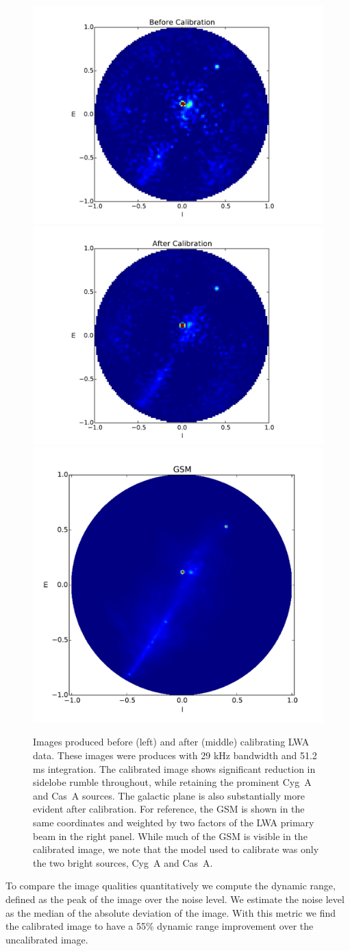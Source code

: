 \documentclass[a4paper,fleqn,usenatbib]{../mnras}
\begin{document}
\begin{figure}
\begin{center}
\includegraphics[width=0.33\linewidth]{figures/cal_paper_data_image_before.pdf}
\includegraphics[width=0.33\linewidth]{figures/cal_paper_data_image_after.pdf}
\includegraphics[width=0.33\linewidth]{figures/cal_paper_gsm_beam_weighted.pdf}
\caption{Images produced before (left) and after (middle) calibrating LWA data. These images were produces with 29 kHz bandwidth and 51.2 ms integration. The calibrated image shows significant reduction in sidelobe rumble throughout, while retaining the prominent Cyg~A and Cas~A sources. The galactic plane is also substantially more evident after calibration. For reference, the GSM is shown in the same coordinates and weighted by two factors of the LWA primary beam in the right panel. While much of the GSM is visible in the calibrated image, we note that the model used to calibrate was only the two bright sources, Cyg~A and Cas~A.
}
\label{fig:data_images}
\end{center}
\end{figure}

To compare the image qualities quantitatively we compute the dynamic range, defined as the peak of the image over the noise level. We estimate the noise level as the median of the absolute deviation of the image. With this metric we find the calibrated image to have a 55\% dynamic range improvement over the uncalibrated image.
\end{document}

